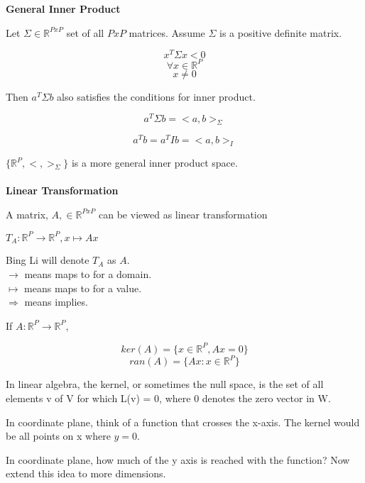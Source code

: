 \documentclass[11pt,fleqn]{book} %
\begin{document}
\textbf{General Inner Product}

Let $\Sigma \in \mathbb{R}^{PxP} $ set of all $PxP$ matrices. Assume $\Sigma$  is a positive definite matrix. 

$$x^T \Sigma x <0 $$
$$\forall x \in \mathbb{R}^P$$
$$ x \neq 0$$

Then $a^T \Sigma b$ also satisfies the conditions for inner product. 

$$a^T \Sigma b = <a,b>_\Sigma$$

$$a^Tb = a^TIb = <a,b>_I$$

$\{ \mathbb{R}^P, <,>_\Sigma \}$ is a more general inner product space. \\
\\ 

\textbf{Linear Transformation}

A matrix, $A, \in \mathbb{R}^{PxP}$ can be viewed as linear transformation

$T_A: \mathbb{R}^P \rightarrow \mathbb{R}^P, x \mapsto Ax$

\begin{remark}
	Bing Li will denote $T_A$ as $A$. \\
	$\rightarrow$ means maps to for a domain.\\
	$\mapsto$ means maps to for a value.\\
	$\Rightarrow$ means implies. \\
	
\end{remark}



If $A: \mathbb{R}^P \rightarrow \mathbb{R}^P$, 

	$$ker(A) = \{x \in \mathbb{R}^P, Ax = 0 \}$$
	$$ran(A) = \{ Ax: x \in \mathbb{R}^P \}$$

\begin{definition}[Kernel]
 In linear algebra, the kernel, or sometimes the null space, is the set of all elements v of V for which L(v) = 0, where 0 denotes the zero vector in W.

 In coordinate plane, think of a function that crosses the x-axis. The kernel would be all points on x where $y=0$.
	
\end{definition}

\begin{definition}[Range]

In coordinate plane, how much of the y axis is reached with the function? Now extend this idea to more dimensions. 
	
\end{definition}
\end{document}
